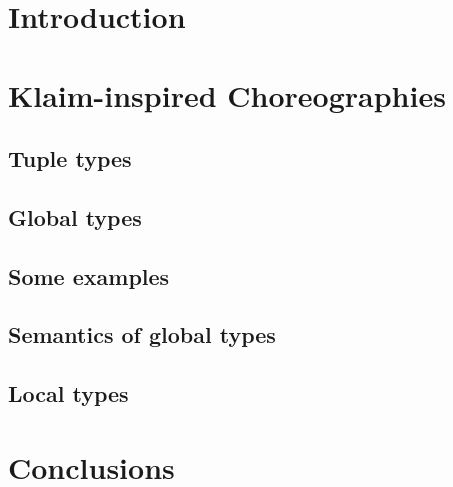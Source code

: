 \documentclass[runningheads,a4paper]{llncs}
\begin{document}
\section{Introduction}
\label{sec:intro}


\section{Klaim-inspired Choreographies}
\label{sec:klaimographies}
\subsection{Tuple types}
\label{sec:tuples}

\subsection{Global types}
\label{sec:gt}

\subsection{Some examples}
\label{sec:examples}

%

\subsection{Semantics of global types}
\label{sec:globsem}


\subsection{Local types}
\label{sec:locsem}

  
\section{Conclusions}
\label{sec:disc}\label{sec:conc}





\iffinal
\else
 \newpage
 \setcounter{tocdepth}{2}
 \listoffixmes
\fi
\end{document}
